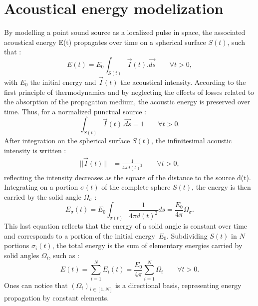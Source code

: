 \documentclass[AMA,STIX1COL]{WileyNJD-v2}
\begin{document}
\section{Acoustical energy modelization}\label{sec2}


By modelling a point sound source as a localized pulse in space, the associated acoustical energy E(t) propagates \cite{jouhaneau} over time on a spherical surface $S(t)$, such that :
%
\begin{equation} 
E(t) = E_0 \int_{S(t)} \overrightarrow{I}(t).\overrightarrow{ds} \qquad \forall t > 0,
\end{equation}
%
with $E_0$ the initial energy and $\overrightarrow{I}(t)$ the acoustical intensity. According to the first principle of thermodynamics and by neglecting the effects of losses related to the absorption of the propagation medium, the acoustic energy is preserved over time. Thus, for a normalized punctual source :
%
\begin{equation} 
\int_{S(t)} \overrightarrow{I}(t).\overrightarrow{ds} = 1 \qquad \forall t > 0.
\end{equation}
%
After integration on the spherical surface $S(t)$, the infinitesimal acoustic intensity is written :
\begin{align} 
|| \overrightarrow{I}(t) || &= \frac{1}{4\pi d(t)^2} \qquad \forall t > 0,
\end{align}
%
reflecting the intensity decreases as the square of the distance to the source d(t). Integrating on a portion $\sigma(t)$ of the complete sphere $S(t)$, the energy is then carried by the solid angle $\Omega_{\sigma}$ :
%
\begin{equation} \label{eq_energie}
E_{\sigma}(t) = E_0 \int_{\sigma(t)}  \frac{1}{4\pi  d(t)^2} ds = \frac{E_0}{4\pi}  \Omega_{\sigma}.
\end{equation}
%
This last equation reflects that the energy of a solid angle is constant over time and corresponds to a portion of the initial energy~$E_0$. Subdividing $S(t)$ in $N$ portions $\sigma_i(t)$, the total energy is the sum of elementary energies carried by solid angles $\Omega_i$, such as : 
%
\begin{equation}
E(t) = \sum_{i=1}^N E_i(t) = \frac{E_0}{4\pi}  \sum_{i=1}^N \Omega_i  \qquad \forall t > 0.
\end{equation}
Ones can notice that $(\Omega_i)_{i\in[1,N] }$ is a directional basis, representing energy propagation by constant elements. 
\end{document}
